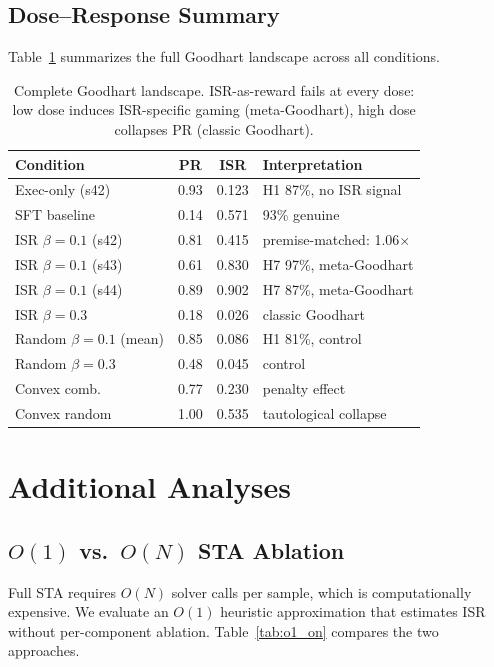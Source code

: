 \documentclass[11pt,a4paper]{article}
\newcommand{\ISR}{\textsc{ISR}}
\newcommand{\STA}{\textsc{STA}}
\begin{document}
\subsection{Dose--Response Summary}

Table~\ref{tab:dose_response} summarizes the full Goodhart landscape across all conditions.

\begin{table}[h]
\centering
\small
\begin{tabular}{lccl}
\toprule
\textbf{Condition} & \textbf{PR} & \textbf{\ISR{}} & \textbf{Interpretation} \\
\midrule
Exec-only (s42) & 0.93 & 0.123 & H1 87\%, no ISR signal \\
SFT baseline & 0.14 & 0.571 & 93\% genuine \\
ISR $\beta{=}0.1$ (s42) & 0.81 & 0.415 & premise-matched: 1.06$\times$ \\
ISR $\beta{=}0.1$ (s43) & 0.61 & 0.830 & H7 97\%, meta-Goodhart \\
ISR $\beta{=}0.1$ (s44) & 0.89 & 0.902 & H7 87\%, meta-Goodhart \\
ISR $\beta{=}0.3$ & 0.18 & 0.026 & classic Goodhart \\
Random $\beta{=}0.1$ (mean) & 0.85 & 0.086 & H1 81\%, control \\
Random $\beta{=}0.3$ & 0.48 & 0.045 & control \\
Convex comb. & 0.77 & 0.230 & penalty effect \\
Convex random & 1.00 & 0.535 & tautological collapse \\
\bottomrule
\end{tabular}
\caption{Complete Goodhart landscape. ISR-as-reward fails at every dose: low dose induces ISR-specific gaming (meta-Goodhart), high dose collapses PR (classic Goodhart).}
\label{tab:dose_response}
\end{table}

\section{Additional Analyses}

\subsection{$O(1)$ vs.\ $O(N)$ STA Ablation}
\label{sec:o1ablation}

Full \STA{} requires $O(N)$ solver calls per sample, which is computationally expensive. We evaluate an $O(1)$ heuristic approximation that estimates ISR without per-component ablation. Table~\ref{tab:o1_on} compares the two approaches.
\end{document}
